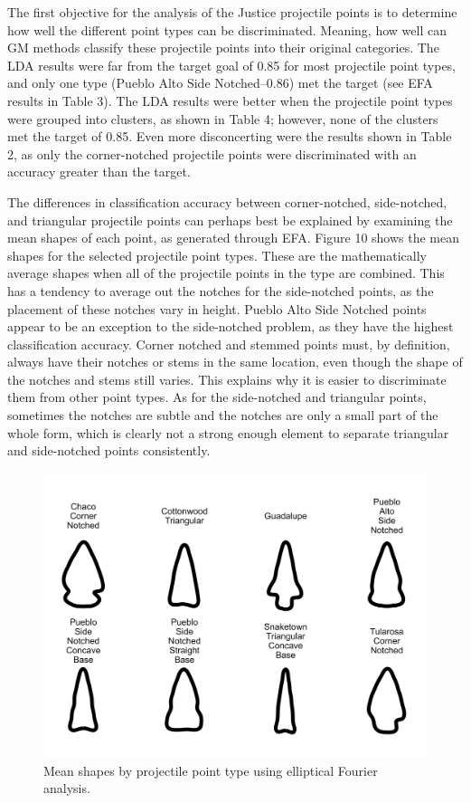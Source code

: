 \documentclass[a4paper]{article}
\begin{document}
The first objective for the analysis of the Justice projectile points is to determine how well the different point types can be discriminated. Meaning, how well can GM methods classify these projectile points into their original categories. The LDA results were far from the target goal of 0.85 for most projectile point types, and only one type (Pueblo Alto Side Notched--0.86) met the target (see EFA results in Table 3). The LDA results were better when the projectile point types were grouped into clusters, as shown in Table 4; however, none of the clusters met the target of 0.85. Even more disconcerting were the results shown in Table 2, as only the corner-notched projectile points were discriminated with an accuracy greater than the target.

The differences in classification accuracy between corner-notched, side-notched, and triangular projectile points can perhaps best be explained by examining the mean shapes of each point, as generated through EFA. Figure 10 shows the mean shapes for the selected projectile point types. These are the mathematically average shapes when all of the projectile points in the type are combined. This has a tendency to average out the notches for the side-notched points, as the placement of these notches vary in height. Pueblo Alto Side Notched points appear to be an exception to the side-notched problem, as they have the highest classification accuracy. Corner notched and stemmed points must, by definition, always have their notches or stems in the same location, even though the shape of the notches and stems still varies. This explains why it is easier to discriminate them from other point types. As for the side-notched and triangular points, sometimes the notches are subtle and the notches are only a small part of the whole form, which is clearly not a strong enough element to separate triangular and side-notched points consistently.

\begin{figure}
\includegraphics[width=1\linewidth]{figures/meanShapesEFA} \caption{Mean shapes by projectile point type using elliptical Fourier analysis.}\label{fig:meanShapes}
\end{figure}
\end{document}
